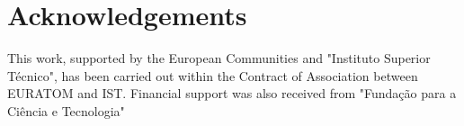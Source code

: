 \chapter*{Acknowledgements}
This work, supported by the European Communities and "Instituto Superior T\'{e}cnico", has been carried out within the Contract of Association between EURATOM and IST. Financial support was also received from "Funda\c{c}\~{a}o para a Ci\^{e}ncia e Tecnologia" 

